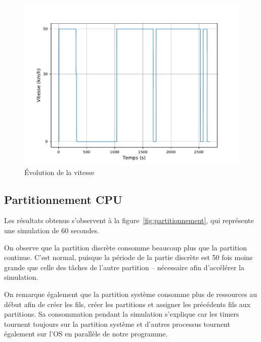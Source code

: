 \documentclass[conference]{IEEEtran}
\begin{document}
\begin{figure}[h]
    \centering
    \includegraphics[width=\linewidth]{speed.pdf}  
    \caption{Évolution de la vitesse}
    \label{fig:speed}
\end{figure}

\subsection{Partitionnement CPU}

Les résultats obtenus s'observent à la figure~\ref{fig:partitionnement}, qui représente
une simulation de 60 secondes.

On observe que la partition discrète consomme beaucoup plus que la partition continue.
C'est normal, puisque la période de la partie discrète est 50 fois moins grande que celle
des tâches de l'autre partition -- nécessaire afin d'accélérer la simulation.

On remarque également que la partition système consomme plus de ressources au début afin
de créer les fils, créer les partitions et assigner les précédents fils aux partitions. Sa
consommation pendant la simulation s'explique car les timers tournent toujours sur la
partition système et d'autres processus tournent également sur l'OS en parallèle de notre
programme.
\end{document}
